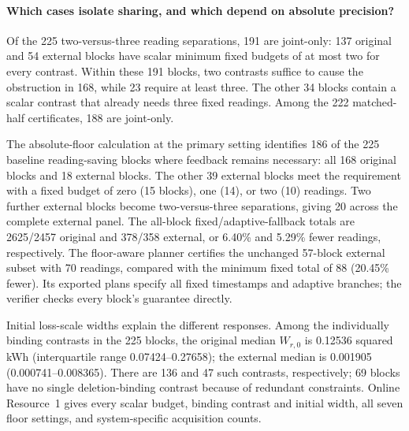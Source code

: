 \paragraph{Which cases isolate sharing, and which depend on absolute precision?}
Of the 225 two-versus-three reading separations, 191 are joint-only:
137 original and 54 external blocks have scalar minimum fixed budgets of at
most two for every contrast. Within these 191 blocks, two contrasts suffice
to cause the obstruction in 168, while 23 require at least three. The other
34 blocks contain a scalar contrast that already needs three fixed readings.
Among the 222 matched-half certificates, 188 are joint-only.

The absolute-floor calculation at the primary setting identifies 186 of the 225 baseline
reading-saving blocks where feedback remains necessary: all 168 original
blocks and 18 external blocks. The other 39 external blocks meet the
requirement with a fixed budget of zero (15 blocks), one (14), or two (10)
readings. Two further external blocks become
two-versus-three separations, giving 20 across the complete external panel.
The all-block fixed/adaptive-fallback totals are 2625/2457 original and
378/358 external, or 6.40\% and 5.29\% fewer readings, respectively.
The floor-aware planner certifies the unchanged 57-block external subset
with 70 readings, compared with the minimum fixed total of 88 (20.45\%
fewer). Its exported plans specify all fixed timestamps and adaptive
branches; the verifier checks every block's guarantee directly.

Initial loss-scale widths explain the different responses. Among the
individually binding contrasts in the 225 blocks, the original median
$W_{r,0}$ is 0.12536 squared kWh (interquartile range 0.07424--0.27658);
the external median is 0.001905 (0.000741--0.008365).
There are 136 and 47 such contrasts, respectively; 69 blocks have no single
deletion-binding contrast because of redundant constraints.
Online Resource~1 gives every scalar budget, binding contrast and initial
width, all seven floor settings, and system-specific acquisition counts.


